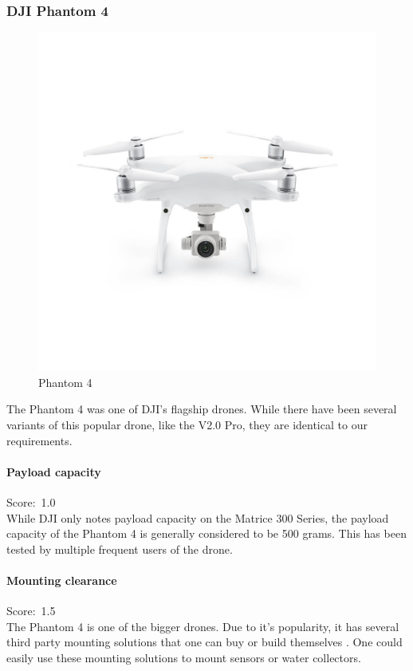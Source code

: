 \newpage
\subsubsection{DJI Phantom 4}
\begin{figure}
\includegraphics[width=1\linewidth]{uav/models/41_phantom4.jpg}
\caption{Phantom 4}
\end{figure}
The Phantom 4 \cite{phantom4} was one of DJI's flagship drones. While there have been several variants of this popular drone, like the V2.0 Pro, they are identical to our requirements.

\paragraph{Payload capacity}\mbox{Score: 1.0} \\
While DJI only notes payload capacity on the Matrice 300 Series, the payload capacity of the Phantom 4 is generally considered to be 500 grams. This has been tested by multiple frequent users of the drone. \cite{phantompilots} 

\paragraph{Mounting clearance}\mbox{Score: 1.5} \\
The Phantom 4 is one of the bigger drones. Due to it's popularity, it has several third party mounting solutions that one can buy \cite{polarpro} or build themselves \cite{thingiverse}. One could easily use these mounting solutions to mount sensors or water collectors.

